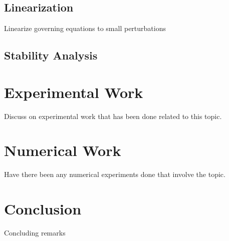 \documentclass{jfm}
\begin{document}
\subsection{Linearization}
Linearize governing equations to small perturbations


\subsection{Stability Analysis}



\section{Experimental Work}
Discuss on experimental work that has been done related to this topic.



\section{Numerical Work}
Have there been any numerical experiments done that involve the topic.



\section{Conclusion}
Concluding remarks




\end{document}
